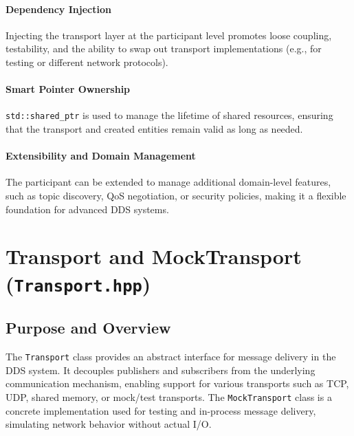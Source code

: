 \documentclass[12pt]{report}
\begin{document}
\paragraph{Dependency Injection}
Injecting the transport layer at the participant level promotes loose coupling, testability, and the ability to swap out transport implementations (e.g., for testing or different network protocols).

\paragraph{Smart Pointer Ownership}
\texttt{std::shared\_ptr} is used to manage the lifetime of shared resources, ensuring that the transport and created entities remain valid as long as needed.

\paragraph{Extensibility and Domain Management}
The participant can be extended to manage additional domain-level features, such as topic discovery, QoS negotiation, or security policies, making it a flexible foundation for advanced DDS systems.

\section{Transport and MockTransport (\texttt{Transport.hpp})}

\subsection{Purpose and Overview}
The \texttt{Transport} class provides an abstract interface for message delivery in the DDS system. It decouples publishers and subscribers from the underlying communication mechanism, enabling support for various transports such as TCP, UDP, shared memory, or mock/test transports. The \texttt{MockTransport} class is a concrete implementation used for testing and in-process message delivery, simulating network behavior without actual I/O.
\end{document}
